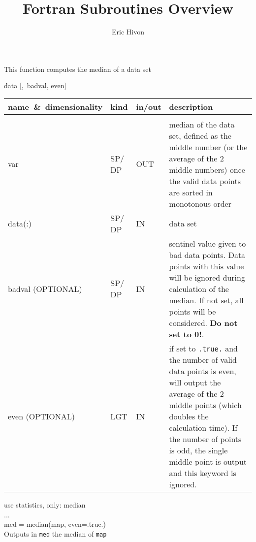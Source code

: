 
\sloppy


\title{\healpix Fortran Subroutines Overview}
 \section[median*]{ }
\label{sub:median}
\author{Eric Hivon}

\begin{facility}
{This function computes the median of a data set}
{\modStatistics}
\end{facility}

\begin{f90function}
{data [,~badval, even]}
\end{f90function}

\begin{arguments}
{
\begin{tabular}{p{0.30\hsize} p{0.05\hsize} p{0.05\hsize} p{0.50\hsize}} \hline  
\textbf{name~\&~dimensionality} & \textbf{kind} & \textbf{in/out} & \textbf{description} \\ \hline
                   &   &   &                           \\ %
var & SP/ DP & OUT & median of the data set, defined as the middle number (or
                   the average of the 2 middle numbers) once the valid data points are
                   sorted in monotonous order\\
data(:) & SP/ DP & IN & data set \\
badval \hskip 3cm (OPTIONAL) & SP/ DP & IN & sentinel value given to bad data points. Data points with this
                   value will be ignored during calculation of the median. If
                   not set, all points will be considered. {\bf Do not set to 0!}.\\
even \hskip 4cm (OPTIONAL) & LGT & IN & if set to {\tt .true.} and the number of
                   valid data points is even, will output the average of the 2
                   middle points (which doubles the calculation time). If the
                   number of points is odd, the single middle point is output
                   and this keyword is ignored.
\end{tabular}
}
\end{arguments}

\begin{example}
{
use statistics, only: median \\
... \\
med = median(map, even=.true.)  \\
}
{
Outputs in {\tt med} the median of {\tt map}
}
\end{example}

